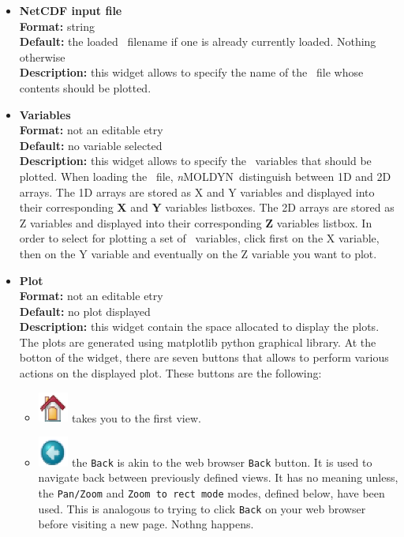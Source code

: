 \documentclass[a4paper,11pt]{report}
\newcommand{\NMOLDYN}{\textit{n}MOLDYN}
\begin{document}
\hypertarget{plot_netcdf_input_file}{}
\begin{itemize}
\item \textbf{NetCDF input file}\\
\textbf{Format:} string\\
\textbf{Default:} the loaded \NetCDF\ filename if one is already currently loaded. Nothing otherwise\\
\textbf{Description:} this widget allows to specify the name of the \NetCDF\ file whose contents should be plotted.

\hypertarget{plot_variables}{}
\item \textbf{Variables}\\
\textbf{Format:} not an editable etry\\
\textbf{Default:} no variable selected\\
\textbf{Description:} this widget allows to specify the \NetCDF\ variables that should be plotted. When loading the \NetCDF\ 
file, \NMOLDYN\ distinguish between 1D and 2D arrays. The 1D arrays are stored as X and Y variables and displayed into 
their corresponding \textbf{X} and \textbf{Y} variables listboxes. The 2D arrays are stored as Z variables and displayed into 
their corresponding \textbf{Z} variables listbox. In order to select for plotting a set of \NetCDF\ variables, click first on the X variable, 
then on the Y variable and eventually on the Z variable you want to plot.

\hypertarget{plot_plot}{}
\item \textbf{Plot}\\
\textbf{Format:} not an editable etry\\
\textbf{Default:} no plot displayed\\
\textbf{Description:} this widget contain the space allocated to display the plots. The plots are generated using 
matplotlib python graphical library. At the botton of the widget, there are seven buttons that allows to perform 
various actions on the displayed plot. These buttons are the following:
\begin{itemize}
\item \includegraphics[width=1cm]{Figures/matplotlib_home.eps} takes you to the first view.

\item \includegraphics[width=1cm]{Figures/matplotlib_back.eps} the \texttt{Back} is akin to the web browser 
\texttt{Back} button. It is used to navigate back between previously defined views. It has no meaning unless, 
the \texttt{Pan/Zoom} and \texttt{Zoom to rect mode} modes, defined below, have been used. This is analogous to trying to 
click \texttt{Back} on your web browser before visiting a new page. Nothng happens.


\end{itemize}
\end{itemize}
\end{document}
